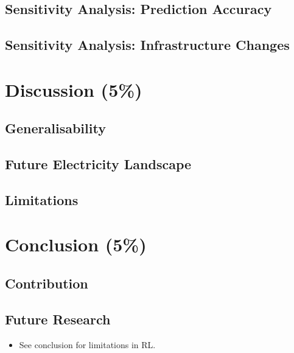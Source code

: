 \documentclass[12pt, article]{article}
\begin{document}
\subsection{Sensitivity Analysis: Prediction Accuracy}
\label{sec:org90f67d6}
\subsection{Sensitivity Analysis: Infrastructure Changes}
\label{sec:orgfec839e}
\section{Discussion (5\%)}
\label{sec:org22ff714}
\subsection{Generalisability}
\label{sec:org73294c2}
\subsection{Future Electricity Landscape}
\label{sec:org898dad4}
\subsection{Limitations}
\label{sec:org5fc2a7c}
\section{Conclusion (5\%)}
\label{sec:org9ad7c7c}
\subsection{Contribution}
\label{sec:orged231da}
\subsection{Future Research}
\label{sec:orgd76cdcc}



\clearpage
\printbibliography

\begin{itemize}
\item See \parencite{vazquez-canteli19_reinf_learn_deman_respon} conclusion for
limitations in RL.
\end{itemize}
\end{document}
